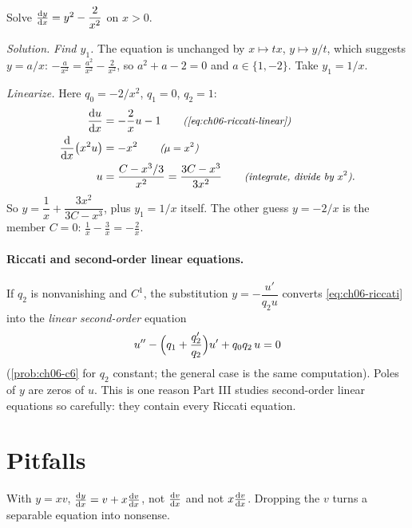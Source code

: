 \begin{example}\label{ex:ch06-riccati}
Solve $\frac{\mathrm{d}y}{\mathrm{d}x} = y^2 - \dfrac{2}{x^2}$ on $x>0$.

\emph{Solution.} \emph{Find $y_1$.} The equation is unchanged by
$x\mapsto tx$, $y\mapsto y/t$, which suggests $y = a/x$:
$-\frac{a}{x^2} = \frac{a^2}{x^2} - \frac2{x^2}$, so $a^2 + a - 2 = 0$ and
$a\in\{1,-2\}$. Take $y_1 = 1/x$.

\emph{Linearize.} Here $q_0 = -2/x^2$, $q_1 = 0$, $q_2 = 1$:
\begin{align*}
  \frac{\mathrm{d}u}{\mathrm{d}x} &= -\frac2x u - 1 \qquad\text{\small\itshape(\eqref{eq:ch06-riccati-linear})}\\
  \frac{\mathrm{d}}{\mathrm{d}x}\bigl(x^2u\bigr) &= -x^2 \qquad\text{\small\itshape($\mu = x^2$)}\\
  u &= \frac{C - x^3/3}{x^2} = \frac{3C - x^3}{3x^2}
     \qquad\text{\small\itshape(integrate, divide by $x^2$)}.
\end{align*}
So $y = \dfrac1x + \dfrac{3x^2}{3C - x^3}$, plus $y_1 = 1/x$ itself. The other
guess $y = -2/x$ is the member $C = 0$: $\frac1x - \frac3x = -\frac2x$.
\end{example}

\paragraph{Riccati and second-order linear equations.}
 If $q_2$ is nonvanishing and
$C^1$, the substitution $y = -\dfrac{u'}{q_2u}$ converts
\eqref{eq:ch06-riccati} into the \emph{linear second-order} equation
\begin{equation}\label{eq:ch06-riccati-second}
  u'' - \Bigl(q_1 + \frac{q_2'}{q_2}\Bigr)u' + q_0q_2\,u = 0
\end{equation}
(\cref{prob:ch06-c6} for $q_2$ constant; the general case is the same
computation). Poles of $y$ are zeros of $u$. This is one reason Part III
studies second-order linear equations so carefully: they contain every
Riccati equation.

\section{Pitfalls}\label{sec:ch06-pitfalls}

\begin{pitfall}\label{pit:ch06-product}
With $y = xv$, $\frac{\mathrm{d}y}{\mathrm{d}x} = v + x\frac{\mathrm{d}v}{\mathrm{d}x}$, not $\frac{\mathrm{d}v}{\mathrm{d}x}$ and not
$x\frac{\mathrm{d}v}{\mathrm{d}x}$. Dropping the $v$ turns a separable equation into nonsense.
\end{pitfall}

